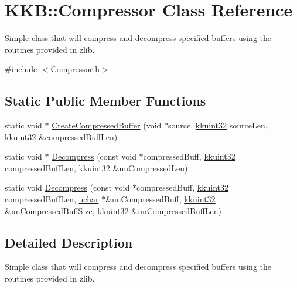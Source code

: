 \hypertarget{class_k_k_b_1_1_compressor}{}\section{K\+KB\+:\+:Compressor Class Reference}
\label{class_k_k_b_1_1_compressor}


Simple class that will compress and decompress specified buffers using the routines provided in zlib.  




{\ttfamily \#include $<$Compressor.\+h$>$}

\subsection*{Static Public Member Functions}
\begin{DoxyCompactItemize}
\item 
static void $\ast$ \hyperlink{class_k_k_b_1_1_compressor_a1f70b55127cc45c05f57d58595e9d2f1}{Create\+Compressed\+Buffer} (void $\ast$source, \hyperlink{namespace_k_k_b_af8d832f05c54994a1cce25bd5743e19a}{kkuint32} source\+Len, \hyperlink{namespace_k_k_b_af8d832f05c54994a1cce25bd5743e19a}{kkuint32} \&compressed\+Buff\+Len)
\item 
static void $\ast$ \hyperlink{class_k_k_b_1_1_compressor_a2a6621b98a88b60530ab344c25177b65}{Decompress} (const void $\ast$compressed\+Buff, \hyperlink{namespace_k_k_b_af8d832f05c54994a1cce25bd5743e19a}{kkuint32} compressed\+Buff\+Len, \hyperlink{namespace_k_k_b_af8d832f05c54994a1cce25bd5743e19a}{kkuint32} \&un\+Compressed\+Len)
\item 
static void \hyperlink{class_k_k_b_1_1_compressor_a9b64a1ab2887f338b1f14351c30a118e}{Decompress} (const void $\ast$compressed\+Buff, \hyperlink{namespace_k_k_b_af8d832f05c54994a1cce25bd5743e19a}{kkuint32} compressed\+Buff\+Len, \hyperlink{namespace_k_k_b_ace9969169bf514f9ee6185186949cdf7}{uchar} $\ast$\&un\+Compressed\+Buff, \hyperlink{namespace_k_k_b_af8d832f05c54994a1cce25bd5743e19a}{kkuint32} \&un\+Compressed\+Buff\+Size, \hyperlink{namespace_k_k_b_af8d832f05c54994a1cce25bd5743e19a}{kkuint32} \&un\+Compressed\+Buff\+Len)
\end{DoxyCompactItemize}


\subsection{Detailed Description}
Simple class that will compress and decompress specified buffers using the routines provided in zlib. 

